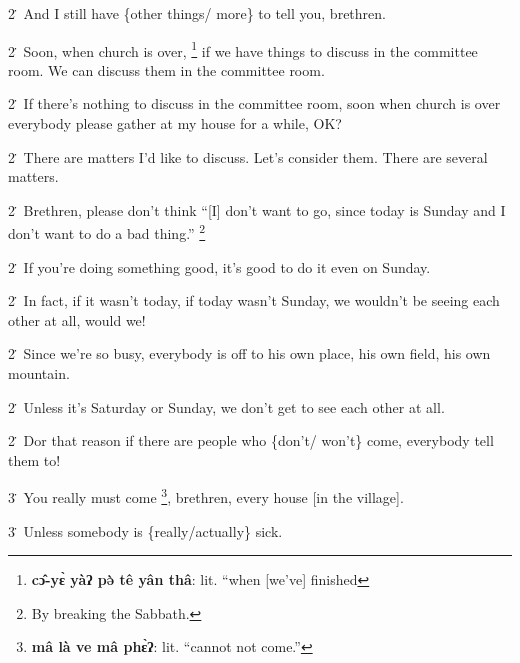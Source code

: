 2\. And I still have \{other things/ more\} to tell you, brethren.

2\. Soon, when church is over, \footnote{\textbf{cɔ̂-yɛ̀ yàʔ pə̀ tê yân thâ}: lit. ``when [we've] finished} if we have things to discuss in the committee
room. We can discuss them in the committee room.

2\. If there's nothing to discuss in the committee room, soon when church is over
everybody please gather at my house for a while, OK?

2\. There are matters I'd like to discuss. Let's consider them. There are several
matters.

2\. Brethren, please don't think ``[I] don't want to go, since today is Sunday
and I don't want to do a bad thing.'' \footnote{By breaking the Sabbath.}

2\. If you're doing something good, it's good to do it even on Sunday.

2\. In fact, if it wasn't today, if today wasn't Sunday, we wouldn't be seeing
each other at all, would we!

2\. Since we're so busy, everybody is off to his own place, his own field, his
own mountain.

2\. Unless it's Saturday or Sunday, we don't get to see each other at all.

2\. Dor that reason if there are people who \{don't/ won't\} come, everybody tell
them to!

3\. You really must come \footnote{\textbf{mâ là ve mâ phɛ̀ʔ}: lit. ``cannot not come.''}, brethren, every house [in the village].

3\. Unless somebody is \{really/actually\} sick.

